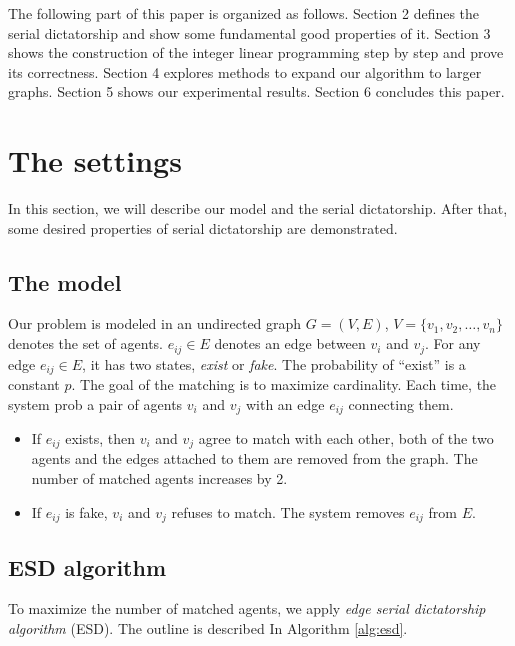 \documentclass[letterpaper]{article}
\begin{document}
The following part of this paper is organized as follows. Section 2 defines the serial dictatorship and show some fundamental good properties of it. Section 3 shows the construction of the integer linear programming step by step and prove its correctness. Section 4 explores methods to expand our algorithm to larger graphs. Section 5 shows our experimental results. Section 6 concludes this paper.


\section{The settings}

In this section, we will describe our model and the serial dictatorship. After that, some desired properties of serial dictatorship are demonstrated.

\subsection{The model}

Our problem is modeled in an undirected graph $G=(V,E)$, $V=\{v_1,v_2,\ldots,v_n\}$ denotes the set of agents. $e_{ij}\in E$ denotes an edge between $v_i$ and $v_j$.
For any edge $e_{ij}\in E$, it has two states, \textit{exist} or \textit{fake}.
The probability of ``exist'' is a constant $p$.
The goal of the matching is to maximize cardinality. Each time, the system prob a pair of agents $v_i$ and $v_j$ with an edge $e_{ij}$ connecting them. 
\begin{itemize}
	\item If $e_{ij}$ exists, then $v_i$ and $v_j$ agree to match with each other, both of the two agents and the edges attached to them are removed from the graph. 
	The number of matched agents increases by 2.
	\item If $e_{ij}$ is fake, $v_i$ and $v_j$ refuses to match. The system removes $e_{ij}$ from $E$.
\end{itemize}


\subsection{ESD algorithm}

To maximize the number of matched agents, we apply \textit{edge serial dictatorship algorithm} (ESD).
The outline is described In Algorithm \ref{alg:esd}.
\end{document}
